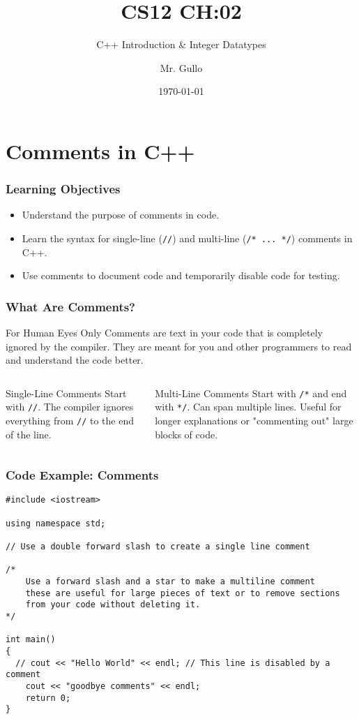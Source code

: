 \documentclass{beamer}
\title[Integer Datatypes]{CS12 CH:02}
\subtitle{C++ Introduction \& Integer Datatypes}
\author[Mr. Gullo]{Mr. Gullo}
\date[\today]{\today}
\begin{document}
\frame{\titlepage}

\section{Comments in C++}

\begin{frame}
\frametitle{Learning Objectives}
\begin{itemize}
    \item Understand the purpose of comments in code.
    \item Learn the syntax for single-line (\texttt{//}) and multi-line (\texttt{/* ... */}) comments in C++.
    \item Use comments to document code and temporarily disable code for testing.
\end{itemize}
\end{frame}

\begin{frame}
\frametitle{What Are Comments?}
\begin{block}{For Human Eyes Only}
Comments are text in your code that is completely ignored by the compiler. They are meant for you and other programmers to read and understand the code better.
\end{block}

\begin{columns}[T]
    \begin{column}{0.5\textwidth}
        \begin{alertblock}{Single-Line Comments}
        Start with \texttt{//}. The compiler ignores everything from \texttt{//} to the end of the line.
        \end{alertblock}
    \end{column}
    \begin{column}{0.5\textwidth}
        \begin{exampleblock}{Multi-Line Comments}
        Start with \texttt{/*} and end with \texttt{*/}. Can span multiple lines. Useful for longer explanations or "commenting out" large blocks of code.
        \end{exampleblock}
    \end{column}
\end{columns}
\end{frame}

\begin{frame}[fragile]
\frametitle{Code Example: Comments}
\begin{verbatim}
#include <iostream>

using namespace std;

// Use a double forward slash to create a single line comment

/*
    Use a forward slash and a star to make a multiline comment
    these are useful for large pieces of text or to remove sections
    from your code without deleting it.
*/

int main()
{
  // cout << "Hello World" << endl; // This line is disabled by a comment
    cout << "goodbye comments" << endl;
    return 0;
}
\end{verbatim}
\end{frame}
\end{document}
